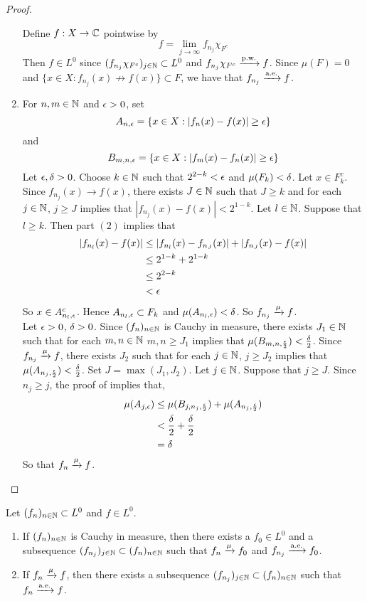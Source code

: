 \documentclass{book}
\begin{document}
\begin{proof}
\begin{enumerate}
	Define $f: X \rightarrow \mathbb{C}$ pointwise by $$f = \lim_{j \rightarrow \infty}f_{n_j}\chi_{F^c} $$
	Then $f \in L^0$ since $(f_{n_j}\chi_{F^c})_{j \in \mathbb{N}} \subset L^0$ and $f_{n_j}\chi_{F^c} \xrightarrow{\text{p.w.}} f$. Since $\mu(F) = 0$ and $\{x \in X: f_{n_j}(x) \not \rightarrow f(x)\} \subset F$, we have that $f_{n_j} \xrightarrow{\text{a.e.}} f$.\\
	\item For $n,m \in \mathbb{N}$ and $\epsilon >0$, set 
	$$A_{n, \epsilon} = \{x \in X: |f_n(x) - f(x) |\geq \epsilon \}$$ 
	and 
	$$B_{m, n, \epsilon} = \{x \in X: |f_m(x) - f_n(x)| \geq \epsilon\}$$ 
	Let $\epsilon, \delta>0$. Choose $k \in \mathbb{N}$ such that $2^{2-k} < \epsilon$ and $\mu(F_k) < \delta$. Let $x \in F_k^c$. Since $f_{n_j}(x) \rightarrow f(x)$, there exists $J \in \mathbb{N}$ such that $J \geq k$ and for each $j \in \mathbb{N}$, $j \geq J$ implies that $|f_{n_j}(x) - f(x)| < 2^{1-k}$. Let $l \in \mathbb{N}$. Suppose that $l \geq k$. Then part $(2)$ implies that
	\begin{align*}
	|f_{n_l}(x) - f(x)| 
	& \leq |f_{n_l}(x) - f_{n_J}(x)| + |f_{n_J}(x) - f(x)| \\
	&\leq 2^{1-k} + 2^{1-k}  \\
	&\leq 2^{2-k} \\
	&< \epsilon
	\end{align*}
	So $x \in A_{n_l, \epsilon}^c$. Hence $A_{n_l, \epsilon} \subset F_k$ and $\mu(A_{n_l, \epsilon}) < \delta$. So $f_{n_j} \xrightarrow{\mu} f$. \\
	Let $\epsilon >0$, $\delta > 0$. Since $(f_n)_{n \in \mathbb{N}}$ is Cauchy in measure, there exists $J_1 \in \mathbb{N}$ such that for each $m,n \in \mathbb{N}$ $m,n \geq J_1$ implies that $\mu(B_{m,n, \frac{\epsilon}{2}}) < \frac{\delta}{2}$. Since $f_{n_j} \xrightarrow{\mu} f$, there exists $J_2$ such that for each $j \in \mathbb{N}$, $j \geq J_2$ implies that $\mu(A_{n_j, \frac{\epsilon}{2}}) < \frac{\delta}{2}$. Set $J = \max(J_1, J_2)$. Let $j \in \mathbb{N}$. Suppose that $j \geq J$. Since $n_j \geq j$, the proof of  implies that, 
	\begin{align*}
	\mu(A_{j, \epsilon}) 
	&\leq \mu(B_{j, n_j, \frac{\epsilon}{2}}) + \mu(A_{n_j, \frac{\epsilon}{2}}) \\
	&< \frac{\delta}{2} + \frac{\delta}{2} \\
	&= \delta
\end{align*}		
	So that $f_n \xrightarrow{\mu} f$.
	\end{enumerate}
	\end{proof}
	
	\begin{ex}  
		Let $(f_n)_{n \in \mathbb{N}} \subset L^0$ and $f \in L^0$. 
		\begin{enumerate}
			\item If $(f_n)_{n \in \mathbb{N}}$ is Cauchy in measure, then there exists a $f_0 \in L^0$ and a subsequence $(f_{n_j})_{j \in \mathbb{N}} \subset (f_n)_{n \in \mathbb{N}}$ such that $f_n \xrightarrow{\mu} f_0$ and $f_{n_j} \xrightarrow{\text{a.e.}} f_0$.
			\item If $f_n \xrightarrow{\mu} f$, then there exists a subsequence $(f_{n_j})_{j \in \mathbb{N}} \subset (f_n)_{n \in \mathbb{N}}$ such that $f_n \xrightarrow{\text{a.e.}} f$.
		\end{enumerate}
	\end{ex}
	
\end{document}
